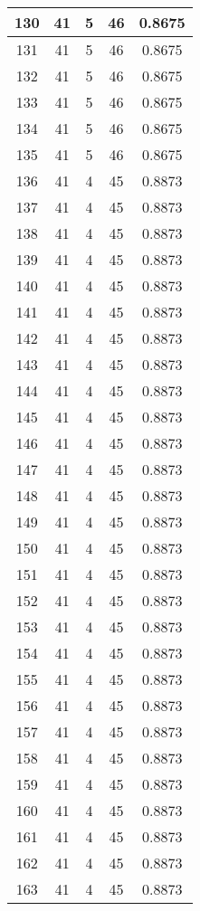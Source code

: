 \documentclass[letterpaper, 12pt]{article}
\begin{document}
\begin{longtable}{|c|c|c|c|c|}
\hline
130 & 41 & 5 & 46 & 0.8675 \\
\hline
131 & 41 & 5 & 46 & 0.8675 \\
\hline
132 & 41 & 5 & 46 & 0.8675 \\
\hline
133 & 41 & 5 & 46 & 0.8675 \\
\hline
134 & 41 & 5 & 46 & 0.8675 \\
\hline
135 & 41 & 5 & 46 & 0.8675 \\
\hline
136 & 41 & 4 & 45 & 0.8873 \\
\hline
137 & 41 & 4 & 45 & 0.8873 \\
\hline
138 & 41 & 4 & 45 & 0.8873 \\
\hline
139 & 41 & 4 & 45 & 0.8873 \\
\hline
140 & 41 & 4 & 45 & 0.8873 \\
\hline
141 & 41 & 4 & 45 & 0.8873 \\
\hline
142 & 41 & 4 & 45 & 0.8873 \\
\hline
143 & 41 & 4 & 45 & 0.8873 \\
\hline
144 & 41 & 4 & 45 & 0.8873 \\
\hline
145 & 41 & 4 & 45 & 0.8873 \\
\hline
146 & 41 & 4 & 45 & 0.8873 \\
\hline
147 & 41 & 4 & 45 & 0.8873 \\
\hline
148 & 41 & 4 & 45 & 0.8873 \\
\hline
149 & 41 & 4 & 45 & 0.8873 \\
\hline
150 & 41 & 4 & 45 & 0.8873 \\
\hline
151 & 41 & 4 & 45 & 0.8873 \\
\hline
152 & 41 & 4 & 45 & 0.8873 \\
\hline
153 & 41 & 4 & 45 & 0.8873 \\
\hline
154 & 41 & 4 & 45 & 0.8873 \\
\hline
155 & 41 & 4 & 45 & 0.8873 \\
\hline
156 & 41 & 4 & 45 & 0.8873 \\
\hline
157 & 41 & 4 & 45 & 0.8873 \\
\hline
158 & 41 & 4 & 45 & 0.8873 \\
\hline
159 & 41 & 4 & 45 & 0.8873 \\
\hline
160 & 41 & 4 & 45 & 0.8873 \\
\hline
161 & 41 & 4 & 45 & 0.8873 \\
\hline
162 & 41 & 4 & 45 & 0.8873 \\
\hline
163 & 41 & 4 & 45 & 0.8873 \\

\end{longtable}
\end{document}
